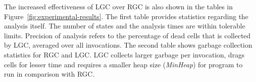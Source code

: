 \documentclass[9pt]{sigplanconf}
\begin{document}
The  increased effectiveness  of LGC  over RGC  is also  shown  in the
tables  in  Figure~\ref{fig:experimental-results}.   The  first  table
provides  statistics  regarding the  analysis  itself.  The number  of
states and the analysis times  are within tolerable limits. Precision
of analysis refers to the percentage of dead cells that is collected by
LGC, averaged over all invocations.
The second table shows garbage  collection statistics for RGC and LGC.
LGC  collects larger garbage  per invocation,  drags cells  for lesser
time and requires a smaller heap size ({\em MinHeap}) for program to
run
in comparison with  RGC.
\end{document}
